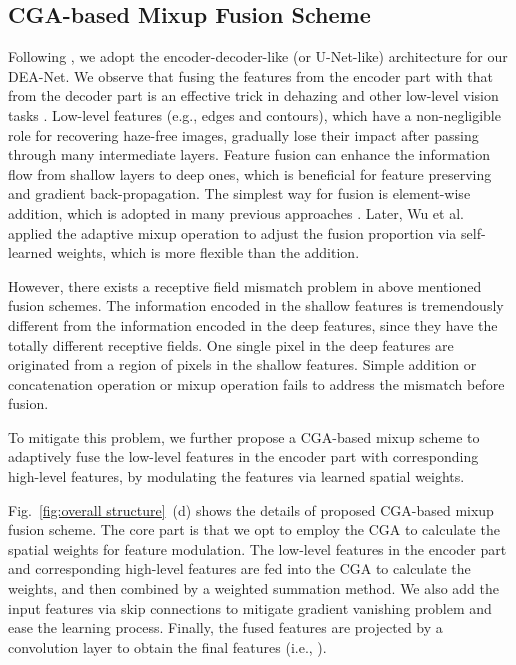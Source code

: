 \documentclass[lettersize,journal]{IEEEtran}
\begin{document}
\subsection{CGA-based Mixup Fusion Scheme}
Following \cite{dong2020CVPR,bai2022TIP,wu2021CVPR,hong2022AAAI}, we adopt the encoder-decoder-like (or U-Net-like) architecture for our DEA-Net.
We observe that fusing the features from the encoder part with that from the decoder part is an effective trick in dehazing and other low-level vision tasks \cite{He2021SP-ESKN,He2023PR,dong2020CVPR,wu2021CVPR}.
Low-level features (e.g., edges and contours), which have a non-negligible role for recovering haze-free images, gradually lose their impact after passing through many intermediate layers.
Feature fusion can enhance the information flow from shallow layers to deep ones, which is beneficial for feature preserving and gradient back-propagation.
The simplest way for fusion is element-wise addition, which is adopted in many previous approaches \cite{dong2020CVPR,bai2022TIP,ye2022ECCVORAL}.
Later, Wu et al. \cite{wu2021CVPR} applied the adaptive mixup operation to adjust the fusion proportion via self-learned weights, which is more flexible than the addition.

However, there exists a receptive field mismatch problem in above mentioned fusion schemes.
The information encoded in the shallow features is tremendously different from the information encoded in the deep features, since they have the totally different receptive fields. 
One single pixel in the deep features are originated from a region of pixels in the shallow features.
Simple addition or concatenation operation or mixup operation fails to address the mismatch before fusion.

To mitigate this problem, we further propose a CGA-based mixup scheme to adaptively fuse the low-level features in the encoder part with corresponding high-level features, by modulating the features via learned spatial weights.



Fig.~\ref{fig:overall structure}~(d) shows the details of proposed CGA-based mixup fusion scheme.
The core part is that we opt to employ the CGA to calculate the spatial weights for feature modulation.
The low-level features in the encoder part and corresponding high-level features are fed into the CGA to calculate the weights, and then combined by a weighted summation method.
We also add the input features via skip connections to mitigate gradient vanishing problem and ease the learning process.
Finally, the fused features are projected by a  convolution layer to obtain the final features (i.e., ). 
\end{document}
